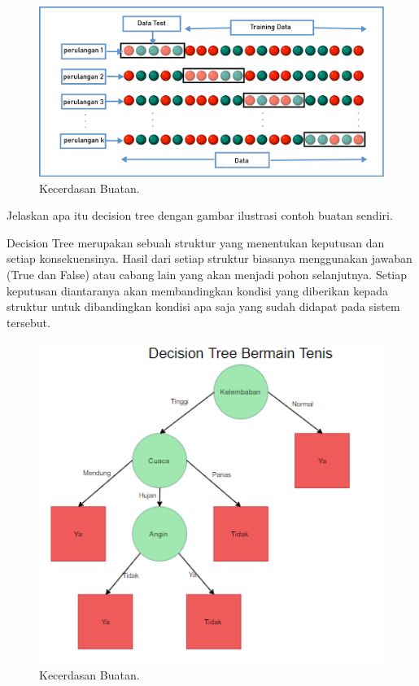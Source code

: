 \hfill\break
\begin{figure}[H]
    \includegraphics[width=1\textwidth]{figures/1174006/chapter2/teori/7.png}
    \centering
    \caption{Kecerdasan Buatan.}
\end{figure}

\noindent
Jelaskan apa itu decision tree dengan gambar ilustrasi contoh buatan sendiri.

\noindent
Decision Tree merupakan sebuah struktur yang menentukan keputusan dan setiap konsekuensinya. Hasil dari setiap struktur biasanya menggunakan jawaban (True dan False) atau cabang lain yang akan menjadi pohon selanjutnya. Setiap keputusan diantaranya akan membandingkan kondisi yang diberikan kepada struktur untuk dibandingkan kondisi apa saja yang sudah didapat pada sistem tersebut.

\hfill\break
\begin{figure}[H]
    \includegraphics[width=1\textwidth]{figures/1174006/chapter2/teori/8.png}
    \centering
    \caption{Kecerdasan Buatan.}
\end{figure}

